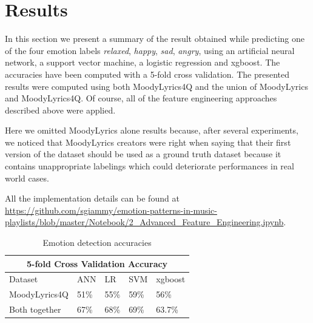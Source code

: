 \section{Results}
In this section we present a summary of the result obtained while predicting one of the four emotion labels \textit{relaxed}, \textit{happy}, \textit{sad}, \textit{angry}, using an artificial neural network, a support vector machine, a logistic regression and xgboost. The accuracies have been computed with a 5-fold cross validation. The presented results were computed using both MoodyLyrics4Q and the union of MoodyLyrics and MoodyLyrics4Q. Of course, all of the feature engineering approaches described above were applied.

Here we omitted MoodyLyrics alone results because, after several experiments, we noticed that MoodyLyrics creators were right when saying that their first version of the dataset should be used as a ground truth dataset because it contains unappropriate labelings which could deteriorate performances in real world cases.

All the implementation details can be found at \url{https://github.com/sgiammy/emotion-patterns-in-music-playlists/blob/master/Notebook/2_Advanced_Feature_Engineering.ipynb}.

\begin{table}[H]
\begin{tabular}{ |p{3cm}||p{1.5cm}|p{1.5cm}|p{1.5cm}|p{1.5cm}|  }
 \hline
 \multicolumn{5}{|c|}{5-fold Cross Validation Accuracy} \\
 \hline
 Dataset & ANN & LR &SVM & xgboost\\
 \hline
MoodyLyrics4Q  & 51\%    &55\% &  59\% & 56\%\\
Both together &   67\%  & 68\%   &69\% &63.7\%\\
\hline
\end{tabular}
\caption{Emotion detection accuracies} \label{tab:comparison}
\end{table}

